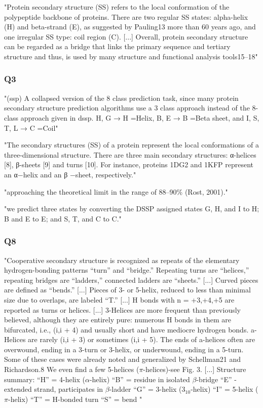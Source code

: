  "Protein secondary structure (SS) refers to the local conformation of the polypeptide backbone of proteins. There are two regular SS states: alpha-helix (H) and beta-strand (E), as suggested by Pauling13 more than 60 years ago, and one irregular SS type: coil region (C). [...] Overall, protein secondary structure can be regarded as a bridge that links the primary sequence and tertiary structure and thus, is used by many structure and functional analysis tools15–18" \cite{Wang2016}
  \subsubsection{Q3}
  "(ssp) A collapsed version of the 8 class prediction task, since many protein secondary structure prediction algorithms use a 3 class approach instead of the 8-class approach given in dssp. {H, G} → H =Helix, {B, E} → B =Beta sheet, and {I, S, T, L} → C =Coil" \cite{Lin2016}

  "The secondary structures (SS) of a protein represent the local conformations of a three-dimensional structure. There are three main secondary structures: α-helices [8], β-sheets [9] and turns [10]. For instance, proteins 1DG2 and 1KFP represent an α−helix and an β −sheet, respectively." \cite{Hattori2017}

  "approaching the theoretical limit in the range of 88–90\% (Rost, 2001)." \cite{Heffernan2017}

  "we predict three states by converting the DSSP assigned states G, H, and I to H; B and E to E; and S, T, and C to C." \cite{Heffernan2017}
  \subsubsection{Q8}
  "Cooperative secondary structure is recognized as repeats of the elementary hydrogen-bonding patterns “turn” and “bridge.” Repeating turns are “helices,” repeating bridges are “ladders,” connected ladders are “sheets.”
  [...]
  Curved pieces are defined as “bends.”
  [...]
  Pieces of 3- or 5-helix, reduced to less than minimal size due to overlaps, are labeled “T.”
  [...]
  H bonds with n = +3,+4,+5 are reported as turns or helices.
  [...]
  3-Helices are more frequent than previously believed, although they are entirely pure: numerous H bonds in them are bifurcated, i.e., (i,i + 4) and usually short and have mediocre hydrogen bonds. a-Helices are rarely (i,i + 3) or sometimes (i,i + 5). The ends of a-helices often are overwound, ending in a 3-turn or 3-helix, or underwound, ending in a 5-turn. Some of these cases were already noted and generalized by Schellman21 and Richardson.8 We even find a few 5-helices ($\pi$-helices)-see Fig. 3.
  [...]
  Structure summary:
  “H” = 4-helix ($\alpha$-helix)
  “B” = residue in isolated $\beta$-bridge
  “E” - extended strand, participates in $\beta$-ladder
  “G” = 3-helix ($3_{10}$-helix)
  “I” = 5-helix ($\pi$-helix)
  “T” = H-bonded turn
  “S” = bend
  "
  
